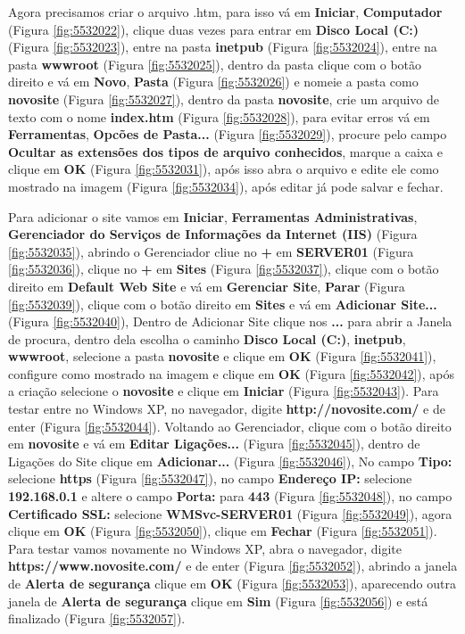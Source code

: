 \documentclass[10pt]{article}
\begin{document}
\par Agora precisamos criar o arquivo .htm, para isso vá em \textbf{Iniciar}, \textbf{Computador} (Figura \ref{fig:5532022}), clique duas vezes para entrar em \textbf{Disco Local (C:)} (Figura \ref{fig:5532023}), entre na pasta \textbf{inetpub} (Figura \ref{fig:5532024}), entre na pasta \textbf{wwwroot} (Figura \ref{fig:5532025}), dentro da pasta clique com o botão direito e vá em \textbf{Novo}, \textbf{Pasta} (Figura \ref{fig:5532026}) e nomeie a pasta como \textbf{novosite} (Figura \ref{fig:5532027}), dentro da pasta \textbf{novosite}, crie um arquivo de texto com o nome \textbf{index.htm} (Figura \ref{fig:5532028}), para evitar erros vá em \textbf{Ferramentas}, \textbf{Opcões de Pasta...} (Figura \ref{fig:5532029}), procure pelo campo \textbf{Ocultar as extensões dos tipos de arquivo conhecidos}, marque a caixa e clique em \textbf{OK} (Figura \ref{fig:5532031}), após isso abra o arquivo e edite ele como mostrado na imagem (Figura \ref{fig:5532034}), após editar já pode salvar e fechar.

\par Para adicionar o site vamos em \textbf{Iniciar}, \textbf{Ferramentas Administrativas}, \textbf{Gerenciador do Serviços de Informações da Internet (IIS)} (Figura \ref{fig:5532035}), abrindo o Gerenciador cliue no \textbf{+} em \textbf{SERVER01} (Figura \ref{fig:5532036}), clique no \textbf{+} em \textbf{Sites} (Figura \ref{fig:5532037}), clique com o botão direito em \textbf{Default Web Site} e vá em \textbf{Gerenciar Site}, \textbf{Parar} (Figura \ref{fig:5532039}), clique com o botão direito em \textbf{Sites} e vá em \textbf{Adicionar Site...} (Figura \ref{fig:5532040}), Dentro de Adicionar Site clique nos \textbf{...} para abrir a Janela de procura, dentro dela escolha o caminho \textbf{Disco Local (C:)}, \textbf{inetpub}, \textbf{wwwroot}, selecione a pasta \textbf{novosite} e clique em \textbf{OK} (Figura \ref{fig:5532041}), configure como mostrado na imagem e clique em \textbf{OK} (Figura \ref{fig:5532042}), após a criação selecione o \textbf{novosite} e clique em \textbf{Iniciar} (Figura \ref{fig:5532043}). Para testar entre no Windows XP, no navegador, digite \textbf{http://novosite.com/} e de enter (Figura \ref{fig:5532044}). Voltando ao Gerenciador, clique com o botão direito em \textbf{novosite} e vá em \textbf{Editar Ligações...} (Figura \ref{fig:5532045}), dentro de Ligações do Site clique em \textbf{Adicionar...} (Figura \ref{fig:5532046}), No campo \textbf{Tipo:} selecione \textbf{https} (Figura \ref{fig:5532047}), no campo \textbf{Endereço IP:} selecione \textbf{192.168.0.1} e altere o campo \textbf{Porta:} para \textbf{443} (Figura \ref{fig:5532048}), no campo \textbf{Certificado SSL:} selecione \textbf{WMSvc-SERVER01} (Figura \ref{fig:5532049}), agora clique em \textbf{OK} (Figura \ref{fig:5532050}), clique em \textbf{Fechar} (Figura \ref{fig:5532051}). Para testar vamos novamente no Windows XP, abra o navegador, digite \textbf{https://www.novosite.com/} e de enter (Figura \ref{fig:5532052}), abrindo a janela de \textbf{Alerta de segurança} clique em \textbf{OK} (Figura \ref{fig:5532053}), aparecendo outra janela de \textbf{Alerta de segurança} clique em \textbf{Sim} (Figura \ref{fig:5532056}) e está finalizado (Figura \ref{fig:5532057}).
\end{document}
